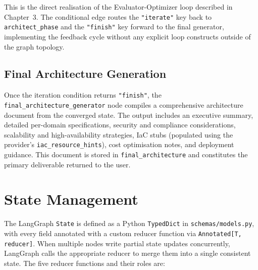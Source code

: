 This is the direct realisation of the Evaluator-Optimizer loop described in Chapter~3. The conditional edge routes the \texttt{"iterate"} key back to \texttt{architect\_phase} and the \texttt{"finish"} key forward to the final generator, implementing the feedback cycle without any explicit loop constructs outside of the graph topology.

\subsection{Final Architecture Generation}

Once the iteration condition returns \texttt{"finish"}, the \texttt{final\_architecture\_generator} node compiles a comprehensive architecture document from the converged state. The output includes an executive summary, detailed per-domain specifications, security and compliance considerations, scalability and high-availability strategies, IaC stubs (populated using the provider's \texttt{iac\_resource\_hints}), cost optimisation notes, and deployment guidance. This document is stored in \texttt{final\_architecture} and constitutes the primary deliverable returned to the user.

\section{State Management}

The LangGraph \texttt{State} is defined as a Python \texttt{TypedDict} in \texttt{schemas/models.py}, with every field annotated with a custom reducer function via \texttt{Annotated[T, reducer]}. When multiple nodes write partial state updates concurrently, LangGraph calls the appropriate reducer to merge them into a single consistent state. The five reducer functions and their roles are:

